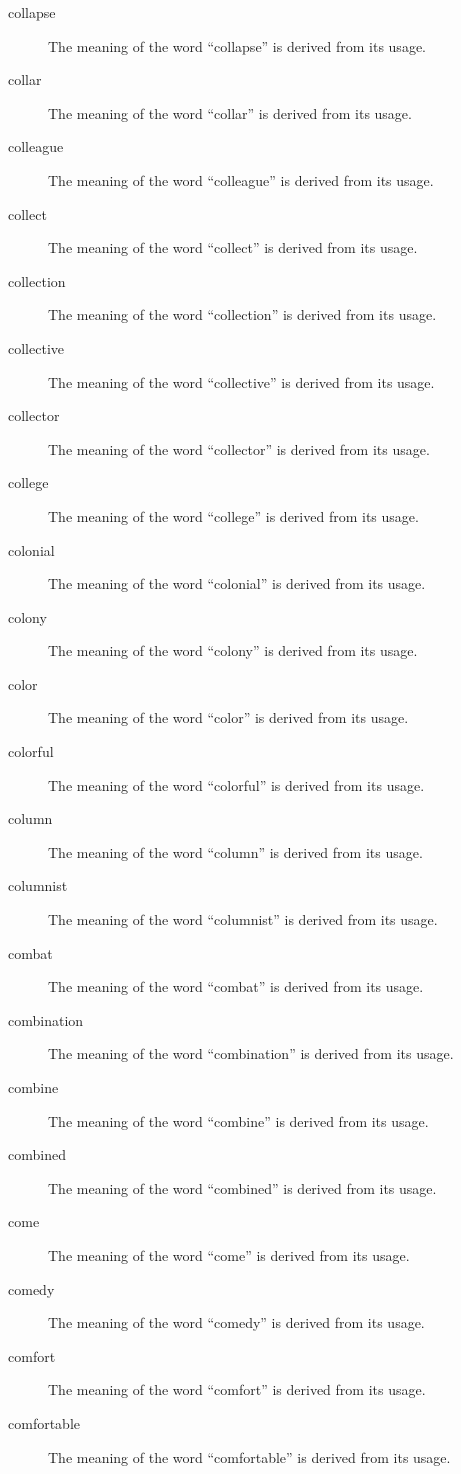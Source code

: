 \documentclass[12pt, letterpaper]{memoir}
\begin{document}
\begin{description}
\item[collapse] The meaning of the word ``collapse'' is derived from its usage.
\item[collar] The meaning of the word ``collar'' is derived from its usage.
\item[colleague] The meaning of the word ``colleague'' is derived from its usage.
\item[collect] The meaning of the word ``collect'' is derived from its usage.
\item[collection] The meaning of the word ``collection'' is derived from its usage.
\item[collective] The meaning of the word ``collective'' is derived from its usage.
\item[collector] The meaning of the word ``collector'' is derived from its usage.
\item[college] The meaning of the word ``college'' is derived from its usage.
\item[colonial] The meaning of the word ``colonial'' is derived from its usage.
\item[colony] The meaning of the word ``colony'' is derived from its usage.
\item[color] The meaning of the word ``color'' is derived from its usage.
\item[colorful] The meaning of the word ``colorful'' is derived from its usage.
\item[column] The meaning of the word ``column'' is derived from its usage.
\item[columnist] The meaning of the word ``columnist'' is derived from its usage.
\item[combat] The meaning of the word ``combat'' is derived from its usage.
\item[combination] The meaning of the word ``combination'' is derived from its usage.
\item[combine] The meaning of the word ``combine'' is derived from its usage.
\item[combined] The meaning of the word ``combined'' is derived from its usage.
\item[come] The meaning of the word ``come'' is derived from its usage.
\item[comedy] The meaning of the word ``comedy'' is derived from its usage.
\item[comfort] The meaning of the word ``comfort'' is derived from its usage.
\item[comfortable] The meaning of the word ``comfortable'' is derived from its usage.

\end{description}
\end{document}
